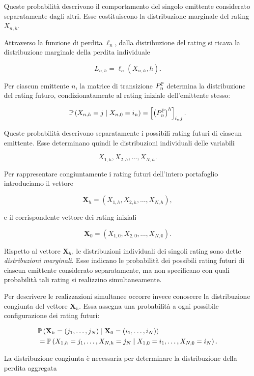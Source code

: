 Queste probabilit\`{a} descrivono il comportamento del singolo
emittente considerato separatamente dagli altri. Esse costituiscono la
distribuzione marginale del rating $X_{n,h}$.

Attraverso la funzione di perdita $\ell_n$, dalla distribuzione del
rating si ricava la distribuzione marginale della perdita individuale

\[
L_{n,h}
=
\ell_n(X_{n,h},h).
\]

Per ciascun emittente $n$, la matrice di transizione
$P_n^{\mathbb{P}}$ determina la distribuzione del rating futuro,
condizionatamente al rating iniziale dell'emittente stesso:

\[
\mathbb{P}
\left(
X_{n,h}=j
\mid
X_{n,0}=i_n
\right)
=
\left[
\left(P_n^{\mathbb{P}}\right)^h
\right]_{i_nj}.
\]

Queste probabilit\`{a} descrivono separatamente i possibili rating
futuri di ciascun emittente. Esse determinano quindi le distribuzioni
individuali delle variabili

\[
X_{1,h},
X_{2,h},
\ldots,
X_{N,h}.
\]

Per rappresentare congiuntamente i rating futuri dell'intero
portafoglio introduciamo il vettore

\[
\mathbf{X}_h
=
\left(
X_{1,h},
X_{2,h},
\ldots,
X_{N,h}
\right),
\]

e il corrispondente vettore dei rating iniziali

\[
\mathbf{X}_0
=
\left(
X_{1,0},
X_{2,0},
\ldots,
X_{N,0}
\right).
\]

Rispetto al vettore $\mathbf{X}_h$, le distribuzioni individuali dei
singoli rating sono dette \emph{distribuzioni marginali}. Esse
indicano le probabilit\`{a} dei possibili rating futuri di ciascun
emittente considerato separatamente, ma non specificano con quali
probabilit\`{a} tali rating si realizzino simultaneamente.

Per descrivere le realizzazioni simultanee occorre invece conoscere la
distribuzione congiunta del vettore $\mathbf{X}_h$. Essa assegna una
probabilit\`{a} a ogni possibile configurazione dei rating futuri:

\[
\begin{split}
&
\mathbb{P}
\left(
\mathbf{X}_h=(j_1,\ldots,j_N)
\mid
\mathbf{X}_0=(i_1,\ldots,i_N)
\right)
\\
&=
\mathbb{P}
\left(
X_{1,h}=j_1,
\ldots,
X_{N,h}=j_N
\mid
X_{1,0}=i_1,
\ldots,
X_{N,0}=i_N
\right).
\end{split}
\]

La distribuzione congiunta \`{e} necessaria per determinare la
distribuzione della perdita aggregata

